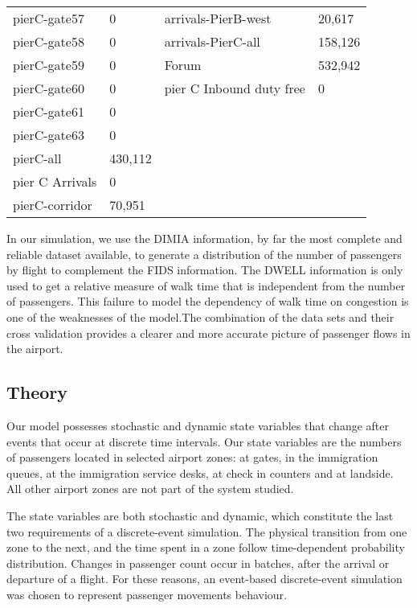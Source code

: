 \documentclass[11pt,onecolumn]{IEEEtran}
\begin{document}
\begin{center}
\begin{table}[H]
\begin{tabular}{|l|l|l|l|}
pierC-gate57	& 0& arrivals-PierB-west		& 20,617\\
pierC-gate58	& 0& arrivals-PierC-all		& 158,126\\
pierC-gate59 	& 0& Forum 	& 532,942\\
pierC-gate60	& 0 &pier C Inbound duty free & 0\\
pierC-gate61	& 0&&\\
pierC-gate63	& 0&&\\
pierC-all	& 430,112&&\\
pier C Arrivals & 0&&\\
pierC-corridor	& 70,951&&\\
\hline
\end{tabular}
\label{tab:DWELLhits}
\end{table}
\end{center}
\clearpage
\newpage

In our simulation, we use the DIMIA information, by far the most complete and reliable dataset available, to generate a distribution of the number of passengers by flight to complement the FIDS information. The DWELL information is only used to get a relative measure of walk time that is independent from the number of passengers. This failure to model the dependency of walk time on congestion is one of the weaknesses of the model.The combination of the data sets and their cross validation provides a clearer and more accurate picture of passenger flows in the airport.

\subsection{Theory}
Our model possesses stochastic and dynamic state variables that change after events that occur at discrete time intervals.
 Our state variables are the numbers of passengers located in selected airport zones: at gates, in the immigration queues, at the immigration service desks, at check in counters and at landside. All other airport zones are not part of the system studied. 

The state variables are both stochastic and dynamic, which constitute the last two requirements of a discrete-event simulation. The physical transition from one zone to the next, and the time spent in a  zone follow time-dependent probability distribution. 
Changes in passenger count occur in batches, after the arrival or departure of a flight.
For these reasons, an event-based discrete-event simulation was chosen to represent passenger movements behaviour\cite{Leemis2004Discrete}.
\end{document}
